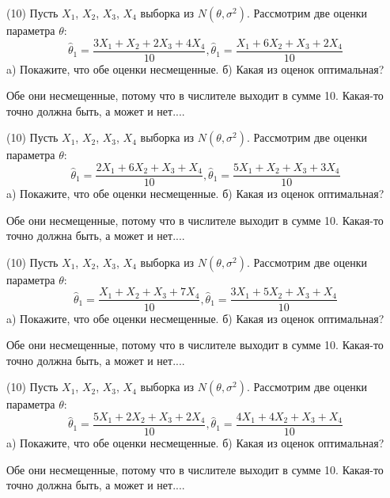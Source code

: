 \begin{problem}
(10) Пусть $X _{1}$, $X _{2}$, $X _{3}$, $X _{4}$ выборка из $N(\theta, \sigma ^{2})$. Рассмотрим две оценки параметра $\theta$:
\[\hat \theta _{1} = \frac{3X _{1} + X _{2} + 2X _{3} + 4X _{4}}{10}, \hat \theta _{1} = \frac{X _{1} + 6X _{2} + X _{3} + 2X _{4}}{10}\]
a) Покажите, что обе оценки несмещенные.
б) Какая из оценок оптимальная?
\end{problem}
\begin{solution}
Обе они несмещенные, потому что в числителе выходит в сумме 10.
Какая-то точно должна быть, а может и нет....
\end{solution}
\begin{problem}
(10) Пусть $X _{1}$, $X _{2}$, $X _{3}$, $X _{4}$ выборка из $N(\theta, \sigma ^{2})$. Рассмотрим две оценки параметра $\theta$:
\[\hat \theta _{1} = \frac{2X _{1} + 6X _{2} + X _{3} + X _{4}}{10}, \hat \theta _{1} = \frac{5X _{1} + X _{2} + X _{3} + 3X _{4}}{10}\]
a) Покажите, что обе оценки несмещенные.
б) Какая из оценок оптимальная?
\end{problem}
\begin{solution}
Обе они несмещенные, потому что в числителе выходит в сумме 10.
Какая-то точно должна быть, а может и нет....
\end{solution}
\begin{problem}
(10) Пусть $X _{1}$, $X _{2}$, $X _{3}$, $X _{4}$ выборка из $N(\theta, \sigma ^{2})$. Рассмотрим две оценки параметра $\theta$:
\[\hat \theta _{1} = \frac{X _{1} + X _{2} + X _{3} + 7X _{4}}{10}, \hat \theta _{1} = \frac{3X _{1} + 5X _{2} + X _{3} + X _{4}}{10}\]
a) Покажите, что обе оценки несмещенные.
б) Какая из оценок оптимальная?
\end{problem}
\begin{solution}
Обе они несмещенные, потому что в числителе выходит в сумме 10.
Какая-то точно должна быть, а может и нет....
\end{solution}
\begin{problem}
(10) Пусть $X _{1}$, $X _{2}$, $X _{3}$, $X _{4}$ выборка из $N(\theta, \sigma ^{2})$. Рассмотрим две оценки параметра $\theta$:
\[\hat \theta _{1} = \frac{5X _{1} + 2X _{2} + X _{3} + 2X _{4}}{10}, \hat \theta _{1} = \frac{4X _{1} + 4X _{2} + X _{3} + X _{4}}{10}\]
a) Покажите, что обе оценки несмещенные.
б) Какая из оценок оптимальная?
\end{problem}
\begin{solution}
Обе они несмещенные, потому что в числителе выходит в сумме 10.
Какая-то точно должна быть, а может и нет....
\end{solution}
